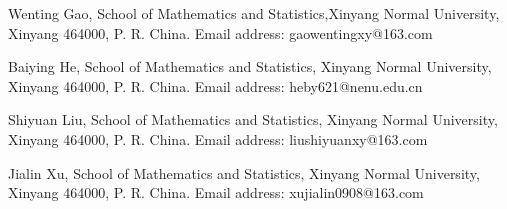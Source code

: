 \documentclass[12pt,reqno]{article}
\begin{document}
	
	Wenting Gao, School of Mathematics and Statistics,Xinyang Normal University, Xinyang 464000, P. R. China. Email address: gaowentingxy@163.com


		
    Baiying He, School of Mathematics and Statistics, Xinyang Normal University, Xinyang 464000, P. R. China. Email address: heby621@nenu.edu.cn
    
    Shiyuan Liu, School of Mathematics and Statistics, Xinyang Normal University, Xinyang 464000, P. R. China. Email address: liushiyuanxy@163.com


    Jialin Xu, School of Mathematics and Statistics, Xinyang Normal University, Xinyang 464000, P. R. China. Email address: xujialin0908@163.com
    
    
        
    
	
\end{document}
